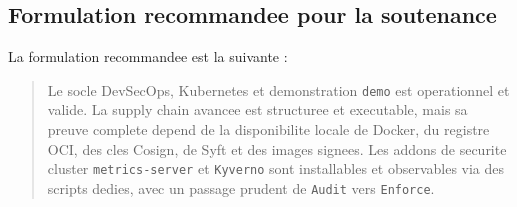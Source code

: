 \subsection{Formulation recommandee pour la soutenance}

La formulation recommandee est la suivante :

\begin{quote}
Le socle DevSecOps, Kubernetes et demonstration \texttt{demo} est operationnel
et valide. La supply chain avancee est structuree et executable, mais sa preuve
complete depend de la disponibilite locale de Docker, du registre OCI, des cles
Cosign, de Syft et des images signees. Les addons de securite cluster
\texttt{metrics-server} et \texttt{Kyverno} sont installables et observables via
des scripts dedies, avec un passage prudent de \texttt{Audit} vers
\texttt{Enforce}.
\end{quote}

